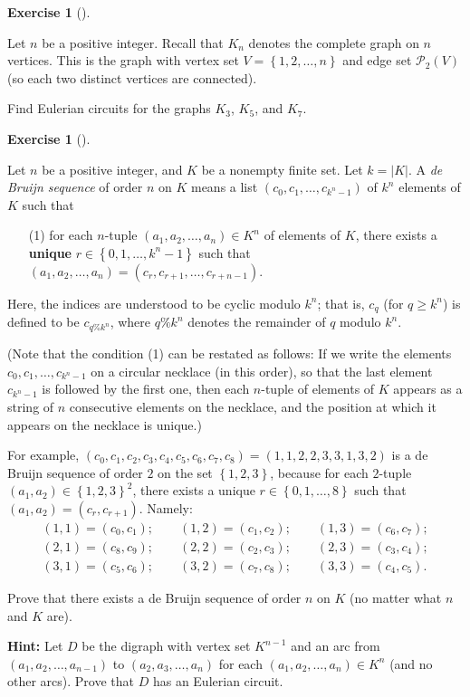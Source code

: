 \documentclass[numbers=enddot,12pt,final,onecolumn,notitlepage]{scrartcl}%
\newcounter{exer}
\theoremstyle{definition}
\newtheorem{exmp}[exer]{Exercise}
\newenvironment{exercise}[1][]
{\begin{exmp}[#1]\begin{leftbar}}
{\end{leftbar}\end{exmp}}
\newcommand{\set}[1]{\left\{ #1 \right\}}
\newcommand{\abs}[1]{\left| #1 \right|}
\newcommand{\tup}[1]{\left( #1 \right)}
\begin{document}
\begin{exercise} \label{exe.eulertrails.Kn}
Let $n$ be a positive integer. Recall that $K_n$ denotes the complete
graph on $n$ vertices. This is the graph with vertex set $V =
\set{1, 2, \ldots, n}$ and edge set $\mathcal{P}_2\tup{V}$ (so each two
distinct vertices are connected).

Find Eulerian circuits for the graphs $K_3$, $K_5$, and $K_7$.
\end{exercise}

\begin{exercise} \label{exe.debruijn.1}
Let $n$ be a positive integer, and $K$ be a nonempty finite set.
Let $k = \abs{K}$.
A \textit{de Bruijn sequence} of order $n$ on $K$ means a list
$\tup{c_0, c_1, \ldots, c_{k^n-1}}$ of $k^n$ elements of $K$
such that

\begin{enumerate}
\item[(1)] for each
$n$-tuple $\tup{a_1, a_2, \ldots, a_n} \in K^n$ of elements of $K$,
there exists a \textbf{unique} $r \in \set{0, 1, \ldots, k^n-1}$ such
that
$\tup{a_1, a_2, \ldots, a_n} = \tup{c_r, c_{r+1}, \ldots, c_{r+n-1}}$.
\end{enumerate}

Here, the indices are understood to be cyclic modulo $k^n$; that is,
$c_q$ (for $q \geq k^n$) is defined to be $c_{q \% k^n}$, where
$q \% k^n$ denotes the remainder of $q$ modulo $k^n$.

(Note that the condition (1) can be restated as follows: If we
write the elements $c_0, c_1, \ldots, c_{k^n-1}$ on a circular
necklace (in this order), so that the last element $c_{k^n-1}$ is
followed by the first one, then each $n$-tuple of elements of $K$
appears as a string of $n$ consecutive elements on the necklace, and
the position at which it appears on the necklace is unique.)

For example, $\tup{c_0, c_1, c_2, c_3, c_4, c_5, c_6, c_7, c_8}
= \tup{1, 1, 2, 2, 3, 3, 1, 3, 2}$ is a de Bruijn sequence
of order $2$ on the set $\set{1, 2, 3}$, because for each $2$-tuple
$\tup{a_1, a_2} \in \set{1, 2, 3}^2$, there exists a unique $r \in \set{0, 1,
\ldots, 8}$ such that $\tup{a_1, a_2} = \tup{c_r, c_{r+1}}$. Namely:
\begin{align*}
\tup{1, 1} = \tup{c_0, c_1}; \qquad
\tup{1, 2} = \tup{c_1, c_2}; \qquad
\tup{1, 3} = \tup{c_6, c_7}; \\
\tup{2, 1} = \tup{c_8, c_9}; \qquad
\tup{2, 2} = \tup{c_2, c_3}; \qquad
\tup{2, 3} = \tup{c_3, c_4}; \\
\tup{3, 1} = \tup{c_5, c_6}; \qquad
\tup{3, 2} = \tup{c_7, c_8}; \qquad
\tup{3, 3} = \tup{c_4, c_5}.
\end{align*}

Prove that there exists a de Bruijn sequence of order $n$ on $K$
(no matter what $n$ and $K$ are).

\textbf{Hint:} Let $D$ be the digraph with vertex set $K^{n-1}$ and
an arc from $\tup{a_1, a_2, \ldots, a_{n-1}}$ to
$\tup{a_2, a_3, \ldots, a_n}$ for each
$\tup{a_1, a_2, \ldots, a_n} \in K^n$ (and no other arcs). Prove that
$D$ has an Eulerian circuit.
\end{exercise}
\end{document}
